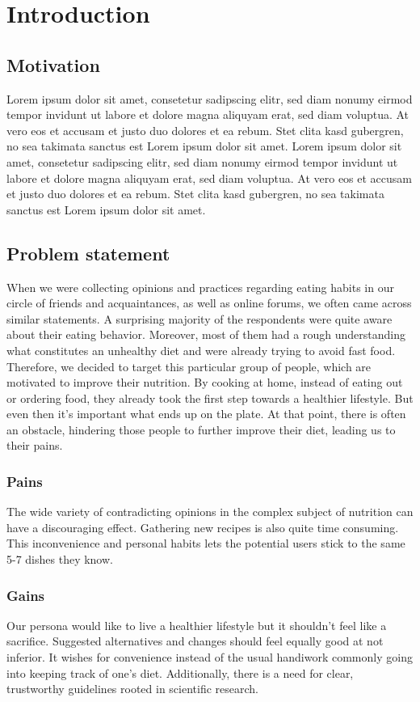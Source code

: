 \chapter{Introduction}
\section{Motivation}
Lorem ipsum dolor sit amet, consetetur sadipscing elitr, sed diam nonumy eirmod tempor invidunt ut labore et dolore magna aliquyam erat, sed diam voluptua. At vero eos et accusam et justo duo dolores et ea rebum. Stet clita kasd gubergren, no sea takimata sanctus est Lorem ipsum dolor sit amet. Lorem ipsum dolor sit amet, consetetur sadipscing elitr, sed diam nonumy eirmod tempor invidunt ut labore et dolore magna aliquyam erat, sed diam voluptua. At vero eos et accusam et justo duo dolores et ea rebum. Stet clita kasd gubergren, no sea takimata sanctus est Lorem ipsum dolor sit amet. \autocite[8]{haco_black_2018}
\section{Problem statement}
When we were collecting opinions and practices regarding eating habits in our circle of friends and acquaintances, as well as online forums, we often came across similar statements. A surprising majority of the respondents were quite aware about their eating behavior. Moreover, most of them had a rough understanding what constitutes an unhealthy diet and were already trying to avoid fast food. Therefore, we decided to target this particular group of people, which are motivated to improve their nutrition. By cooking at home, instead of eating out or ordering food, they already took the first step towards a healthier lifestyle.
But even then it’s important what ends up on the plate. At that point, there is often an obstacle, hindering those people to further improve their diet, leading us to their  pains.

\subsection{Pains}
The wide variety of contradicting opinions in the complex subject of nutrition can have a discouraging effect. Gathering new recipes is also quite time consuming. This inconvenience and personal habits lets the potential users stick to the same 5-7 dishes they know.

\subsection{Gains}
Our persona would like to live a healthier lifestyle but it shouldn’t feel like a sacrifice. Suggested alternatives and changes should feel equally good at not inferior. It wishes for convenience instead of the usual handiwork commonly going into keeping track of one's diet. Additionally, there is a need for clear, trustworthy guidelines rooted in scientific research.
